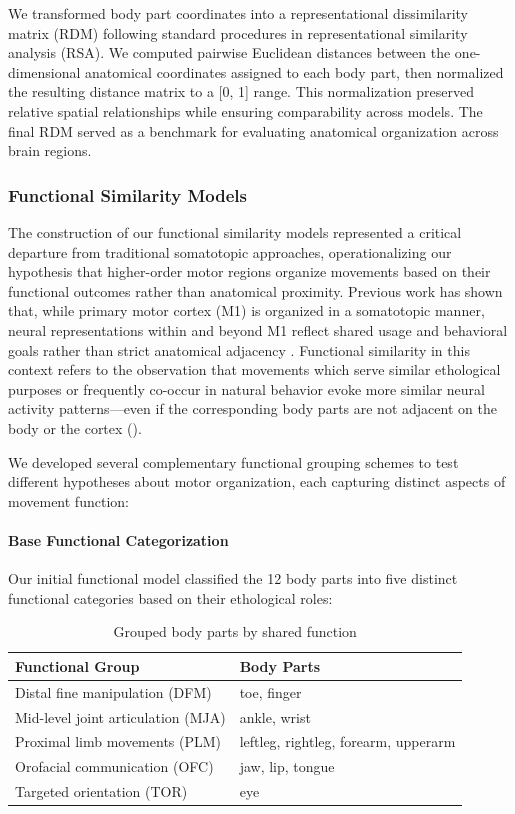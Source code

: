\documentclass{article}
\begin{document}
We transformed body part coordinates into a representational dissimilarity matrix (RDM) following standard procedures in representational similarity analysis (RSA). We computed pairwise Euclidean distances between the one-dimensional anatomical coordinates assigned to each body part, then normalized the resulting distance matrix to a [0, 1] range. This normalization preserved relative spatial relationships while ensuring comparability across models. The final RDM served as a benchmark for evaluating anatomical organization across brain regions.

\subsubsection{Functional Similarity Models}\label{models}
The construction of our functional similarity models represented a critical departure from traditional somatotopic approaches, operationalizing our hypothesis that higher-order motor regions organize movements based on their functional outcomes rather than anatomical proximity. Previous work has shown that, while primary motor cortex (M1) is organized in a somatotopic manner, neural representations within and beyond M1 reflect shared usage and behavioral goals rather than strict anatomical adjacency \citep{ejaz2015}. Functional similarity in this context refers to the observation that movements which serve similar ethological purposes or frequently co-occur in natural behavior evoke more similar neural activity patterns—even if the corresponding body parts are not adjacent on the body or the cortex (\citep{Gallivan2013}). 

We developed several complementary functional grouping schemes to test different hypotheses about motor organization, each capturing distinct aspects of movement function:

\paragraph{Base Functional Categorization}
Our initial functional model classified the 12 body parts into five distinct functional categories based on their ethological roles:
\begin{table}[h]
\centering
\begin{tabular}{|l|l|}
\hline
\textbf{Functional Group} & \textbf{Body Parts} \\
\hline
Distal fine manipulation (DFM) & toe, finger \\
Mid-level joint articulation (MJA) & ankle, wrist \\
Proximal limb movements (PLM) & leftleg, rightleg, forearm, upperarm \\
Orofacial communication (OFC) & jaw, lip, tongue \\
Targeted orientation (TOR) & eye \\
\hline
\end{tabular}
\caption{Grouped body parts by shared function}
\label{tab:grouped_func}
\end{table}
\end{document}
